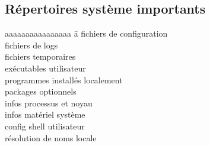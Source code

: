 \documentclass{article}
\begin{document}
\begin{multicols}{4}

    \section*{Répertoires système importants}
    \begin{tabbing}
        aaaaaaaaaaaaaaaa \= a \kill
         \> fichiers de configuration \\
         \> fichiers de logs \\
         \> fichiers temporaires \\
         \> exécutables utilisateur \\
         \> programmes installés localement \\
         \> packages optionnels \\
         \> infos processus et noyau \\
         \> infos matériel système \\
         \> config shell utilisateur \\
         \> résolution de noms locale
    \end{tabbing}


\end{multicols}
\end{document}
